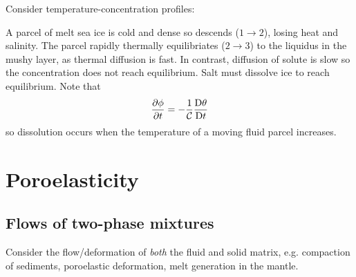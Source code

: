 \documentclass{jknotes}
\newcommand{\C}{\mathcal{C}}
\begin{document}
Consider temperature-concentration profiles:
\begin{center}
\end{center}

A parcel of melt sea ice is cold and dense so descends ($1 \to 2$), losing heat and
salinity. The parcel rapidly thermally equilibriates ($2 \to 3$) to the liquidus in the
mushy layer, as thermal diffusion is fast. In contrast, diffusion of solute is
slow so the concentration does not reach equilibrium. Salt must dissolve ice
to reach equilibrium. Note that
\begin{equation}
	\frac{\partial \phi}{\partial t} = -\frac{1}{\C} \frac{\diffD
	\theta}{\diffD t}
\end{equation}
so dissolution occurs when the temperature of a moving fluid parcel
increases.

\section{Poroelasticity}
\subsection{Flows of two-phase mixtures}
Consider the flow/deformation of \emph{both} the fluid and solid matrix, e.g.
compaction of sediments, poroelastic deformation, melt generation in the
mantle. 
\end{document}
